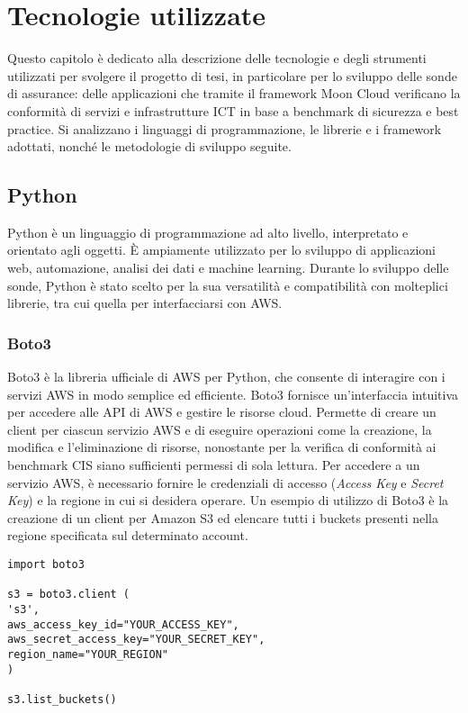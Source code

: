 \chapter{Tecnologie utilizzate}
\label{cap:tecnologie}

Questo capitolo è dedicato alla descrizione delle tecnologie e degli strumenti utilizzati per svolgere il progetto di tesi, in particolare per lo sviluppo delle sonde di assurance: delle applicazioni che tramite il framework Moon Cloud verificano la conformità di servizi e infrastrutture ICT in base a benchmark di sicurezza e best practice. Si analizzano i linguaggi di programmazione, le librerie e i framework adottati, nonché le metodologie di sviluppo seguite. 


\section{Python}
\label{sec:python}

Python è un linguaggio di programmazione ad alto livello, interpretato e orientato agli oggetti. È ampiamente utilizzato per lo sviluppo di applicazioni web, automazione, analisi dei dati e machine learning. Durante lo sviluppo delle sonde, Python è stato scelto per la sua versatilità e compatibilità con molteplici librerie, tra cui quella per interfacciarsi con AWS.

\subsection{Boto3}
\label{sec:boto3}

Boto3 è la libreria ufficiale di AWS per Python, che consente di interagire con i servizi AWS in modo semplice ed efficiente. Boto3 fornisce un'interfaccia intuitiva per accedere alle API di AWS e gestire le risorse cloud. Permette di creare un client per ciascun servizio AWS e di eseguire operazioni come la creazione, la modifica e l'eliminazione di risorse, nonostante per la verifica di conformità ai benchmark CIS siano sufficienti permessi di sola lettura. Per accedere a un servizio AWS, è necessario fornire le credenziali di accesso (\textit{Access Key} e \textit{Secret Key}) e la regione in cui si desidera operare. Un esempio di utilizzo di Boto3 è la creazione di un client per Amazon S3 ed elencare tutti i buckets presenti nella regione specificata sul determinato account.

\begin{lstlisting}[style=mypython, caption={Esempio di utilizzo di Boto3 per elencare i bucket S3}]
import boto3

s3 = boto3.client (
's3',
aws_access_key_id="YOUR_ACCESS_KEY",
aws_secret_access_key="YOUR_SECRET_KEY",
region_name="YOUR_REGION"
)

s3.list_buckets()
\end{lstlisting}

